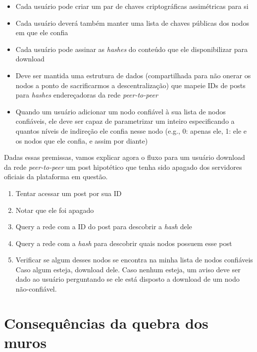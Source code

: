 \begin{itemize}
    \item Cada usuário pode criar um par de chaves criptográficas assimétricas para si
    \item Cada usuário deverá também manter uma lista de chaves públicas dos nodos em que ele confia
    \item Cada usuário pode assinar as \textit{hashes} do conteúdo que ele disponibilizar para download
    \item Deve ser mantida uma estrutura de dados (compartilhada para não onerar os nodos a ponto de sacrificarmos a descentralização) que mapeie IDs de posts para \textit{hashes} endereçadoras da rede \textit{peer-to-peer}
    \item Quando um usuário adicionar um nodo confiável à sua lista de nodos confiáveis, ele deve ser capaz de parametrizar um inteiro especificando a quantos níveis de indireção ele confia nesse nodo (e.g., 0: apenas ele, 1: ele e os nodos que ele confia, e assim por diante)
\end{itemize}

Dadas essas premissas, vamos explicar agora o fluxo para um usuário download da rede \textit{peer-to-peer} um post hipotético que tenha sido apagado dos servidores oficiais da plataforma em questão.

\begin{enumerate}
    \item Tentar acessar um post por sua ID
    \item Notar que ele foi apagado
    \item Query a rede com a ID do post para descobrir a \textit{hash} dele
    \item Query a rede com a \textit{hash} para descobrir quais nodos possuem esse post
    \item Verificar se algum desses nodos se encontra na minha lista de nodos confiáveis
          \subitem Caso algum esteja, download dele.
          \subitem Caso nenhum esteja, um aviso deve ser dado ao usuário perguntando se ele está disposto a download de um nodo não-confiável.
\end{enumerate}

\section{Consequências da quebra dos muros}

